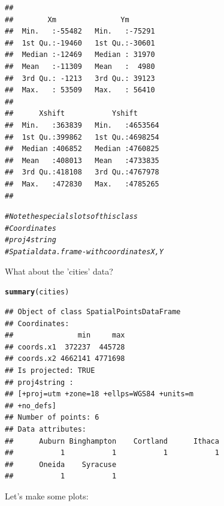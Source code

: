 \documentclass{article}\usepackage[]{graphicx}\usepackage[]{color}
\makeatletter
\newcommand{\hlcom}[1]{\textcolor[rgb]{0.678,0.584,0.686}{\textit{#1}}}%
\newcommand{\hlstd}[1]{\textcolor[rgb]{0.345,0.345,0.345}{#1}}%
\newcommand{\hlkwd}[1]{\textcolor[rgb]{0.737,0.353,0.396}{\textbf{#1}}}%
\newenvironment{kframe}{%
 \def\at@end@of@kframe{}%
 \ifinner\ifhmode%
  \def\at@end@of@kframe{\end{minipage}}%
  \begin{minipage}{\columnwidth}%
 \fi\fi%
 \def\FrameCommand##1{\hskip\@totalleftmargin \hskip-\fboxsep
 \colorbox{shadecolor}{##1}\hskip-\fboxsep
     \hskip-\linewidth \hskip-\@totalleftmargin \hskip\columnwidth}%
 \MakeFramed {\advance\hsize-\width
   \@totalleftmargin\z@ \linewidth\hsize
   \@setminipage}}%
 {\par\unskip\endMakeFramed%
 \at@end@of@kframe}
\newenvironment{knitrout}{}{} %
\makeatother
\begin{document}
\begin{knitrout}
\begin{kframe}
\begin{verbatim}
##                                                 
##        Xm               Ym        
##  Min.   :-55482   Min.   :-75291  
##  1st Qu.:-19460   1st Qu.:-30601  
##  Median :-12469   Median : 31970  
##  Mean   :-11309   Mean   :  4980  
##  3rd Qu.: -1213   3rd Qu.: 39123  
##  Max.   : 53509   Max.   : 56410  
##                                   
##      Xshift           Yshift       
##  Min.   :363839   Min.   :4653564  
##  1st Qu.:399862   1st Qu.:4698254  
##  Median :406852   Median :4760825  
##  Mean   :408013   Mean   :4733835  
##  3rd Qu.:418108   3rd Qu.:4767978  
##  Max.   :472830   Max.   :4785265  
## 
\end{verbatim}
\begin{alltt}
\hlcom{#Note the special slots of this class}
\hlcom{#Coordinates}
\hlcom{#proj4string}
\hlcom{#Spatial data.frame - with coordinates X,Y}
\end{alltt}
\end{kframe}
\end{knitrout}
What about the 'cities' data?

\begin{knitrout}
\color{fgcolor}\begin{kframe}
\begin{alltt}
\hlkwd{summary}\hlstd{(cities)}
\end{alltt}
\begin{verbatim}
## Object of class SpatialPointsDataFrame
## Coordinates:
##               min     max
## coords.x1  372237  445728
## coords.x2 4662141 4771698
## Is projected: TRUE 
## proj4string :
## [+proj=utm +zone=18 +ellps=WGS84 +units=m
## +no_defs]
## Number of points: 6
## Data attributes:
##      Auburn Binghampton    Cortland      Ithaca 
##           1           1           1           1 
##      Oneida    Syracuse 
##           1           1
\end{verbatim}
\end{kframe}
\end{knitrout}

Let's make some plots:
\end{document}
